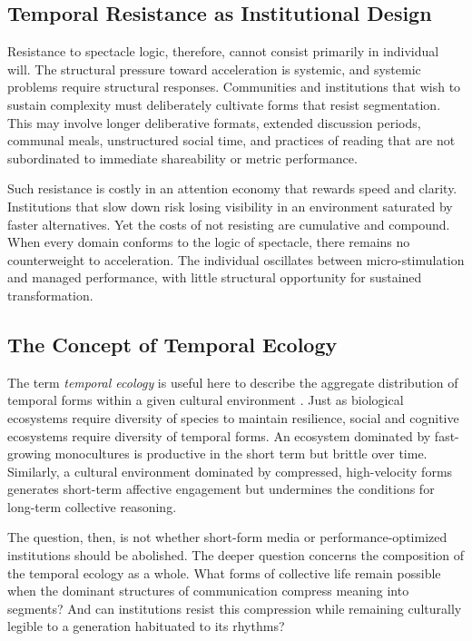 \documentclass[12pt]{article}
\begin{document}
\subsection{Temporal Resistance as Institutional Design}

Resistance to spectacle logic, therefore, cannot consist primarily in individual will. The structural pressure toward acceleration is systemic, and systemic problems require structural responses. Communities and institutions that wish to sustain complexity must deliberately cultivate forms that resist segmentation. This may involve longer deliberative formats, extended discussion periods, communal meals, unstructured social time, and practices of reading that are not subordinated to immediate shareability or metric performance.

Such resistance is costly in an attention economy that rewards speed and clarity. Institutions that slow down risk losing visibility in an environment saturated by faster alternatives. Yet the costs of not resisting are cumulative and compound. When every domain conforms to the logic of spectacle, there remains no counterweight to acceleration. The individual oscillates between micro-stimulation and managed performance, with little structural opportunity for sustained transformation.

\subsection{The Concept of Temporal Ecology}

The term \emph{temporal ecology} is useful here to describe the aggregate distribution of temporal forms within a given cultural environment \citep{Hassan2003}. Just as biological ecosystems require diversity of species to maintain resilience, social and cognitive ecosystems require diversity of temporal forms. An ecosystem dominated by fast-growing monocultures is productive in the short term but brittle over time. Similarly, a cultural environment dominated by compressed, high-velocity forms generates short-term affective engagement but undermines the conditions for long-term collective reasoning.

The question, then, is not whether short-form media or performance-optimized institutions should be abolished. The deeper question concerns the composition of the temporal ecology as a whole. What forms of collective life remain possible when the dominant structures of communication compress meaning into segments? And can institutions resist this compression while remaining culturally legible to a generation habituated to its rhythms?
\end{document}
